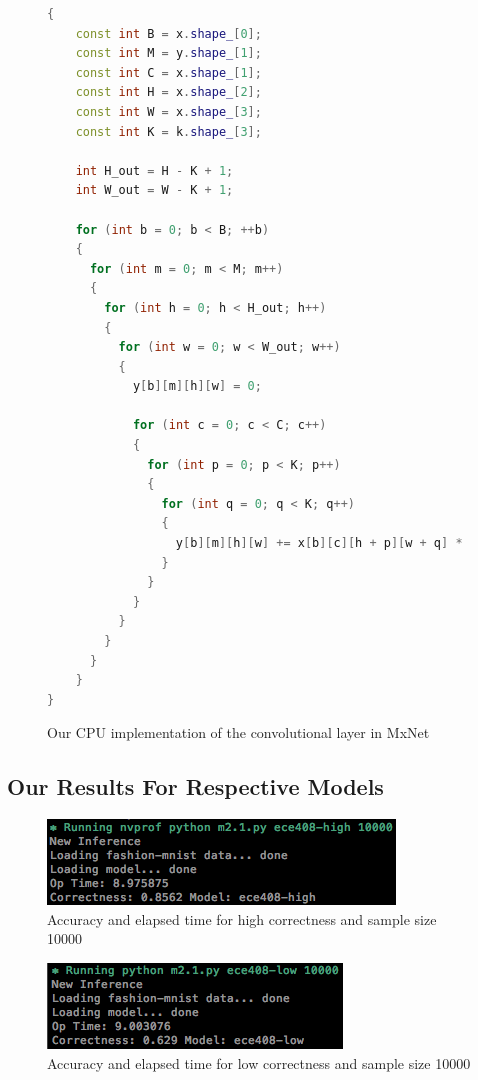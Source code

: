 \documentclass[titlepage]{article}
\begin{document}
\begin{figure}[h!]
\begin{lstlisting}[language=C++]
{
    const int B = x.shape_[0];
    const int M = y.shape_[1];
    const int C = x.shape_[1];
    const int H = x.shape_[2];
    const int W = x.shape_[3];
    const int K = k.shape_[3];

    int H_out = H - K + 1;
    int W_out = W - K + 1;

    for (int b = 0; b < B; ++b)
    {
      for (int m = 0; m < M; m++)
      {
        for (int h = 0; h < H_out; h++)
        {
          for (int w = 0; w < W_out; w++)
          {
            y[b][m][h][w] = 0;

            for (int c = 0; c < C; c++)
            {
              for (int p = 0; p < K; p++)
              {
                for (int q = 0; q < K; q++)
                {
                  y[b][m][h][w] += x[b][c][h + p][w + q] * k[m][c][p][q];
                }
              }
            }
          }
        }
      }
    }
}
\end{lstlisting}
\caption{Our CPU implementation of the convolutional layer in MxNet}
\end{figure}

\newpage

\subsection*{Our Results For Respective Models}

\begin{figure}[h!]
\includegraphics[width=\linewidth]{ece-408-high-10000.png}
\caption{Accuracy and elapsed time for high correctness and sample size 10000}
\label{fig:flowFree}
\end{figure}

\begin{figure}[h!]
\includegraphics[width=\linewidth]{ece-408-low-10000.png}
\caption{Accuracy and elapsed time for low correctness and sample size 10000}
\label{fig:flowFree}
\end{figure}
\end{document}
